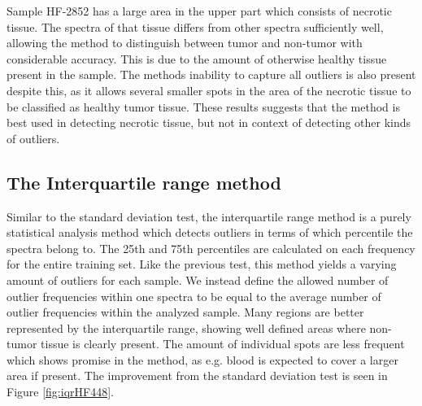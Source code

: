 Sample HF-2852 has a large area in the upper part which consists of necrotic tissue. The spectra of that tissue differs from other spectra sufficiently well, allowing the method to distinguish between tumor and non-tumor with considerable accuracy. This is due to the amount of otherwise healthy tissue present in the sample. The methods inability to capture all outliers is also present despite this, as it allows several smaller spots in the area of the necrotic tissue to be classified as healthy tumor tissue. These results suggests that the method is best used in detecting necrotic tissue, but not in context of detecting other kinds of outliers.

\subsection{The Interquartile range method}

Similar to the standard deviation test, the interquartile range method is a purely statistical analysis method which detects outliers in terms of which percentile the spectra belong to. The 25th and 75th percentiles are calculated on each frequency for the entire training set. Like the previous test, this method yields a varying amount of outliers for each sample. We instead define the allowed number of outlier frequencies within one spectra to be equal to the average number of outlier frequencies within the analyzed sample. Many regions are better represented by the interquartile range, showing well defined areas where non-tumor tissue is clearly present. The amount of individual spots are less frequent which shows promise in the method, as e.g. blood is expected to cover a larger area if present. The improvement from the standard deviation test is seen in Figure \ref{fig:iqrHF448}.

